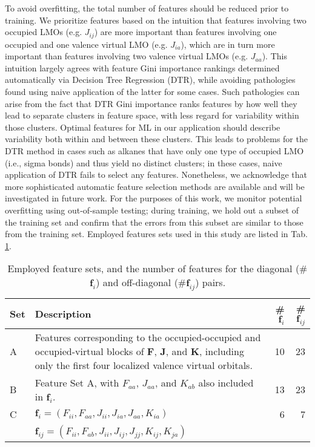 \documentclass[%
 aps,
 prb,
 twocolumn,
%
 reprint,%
%
citeautoscript,
%
showkeys
]{revtex4-1}
\begin{document}
%

%
%

To avoid overfitting, the total number of features should be reduced prior to training. We prioritize features based on the intuition that features involving two occupied LMOs (e.g. $J_{ij}$) are more important than features involving one occupied and one valence virtual LMO (e.g. $J_{ia}$), which are in turn more important than features involving two valence virtual LMOs (e.g. $J_{aa}$). %
%
This intuition largely agrees with feature Gini importance rankings determined automatically via Decision Tree Regression (DTR),\cite{DTR} while avoiding pathologies found using naive application of the latter for some cases. %
Such pathologies can arise from the fact that DTR Gini importance ranks features by how well they lead to separate clusters in feature space, with less regard for variability within those clusters.\cite{DTR} 
Optimal features for ML in our application should describe  variability both within and between these clusters. 
This leads to problems for the DTR method in cases such as alkanes that have only one type of occupied LMO (i.e., sigma bonds) and thus yield no distinct clusters; in these cases, naive application of DTR fails to select any features. Nonetheless, we acknowledge that more sophisticated automatic feature selection methods are available and will be investigated in future work.
For the purposes of this work, we monitor potential overfitting using out-of-sample testing; during training, we hold out a subset of the training set and confirm that the errors from this subset are similar to those from the training set.
%
%
Employed features sets used in this study are listed in Tab. \ref{table:feature_sets}.
%


\begin{table}[htbp]
\caption{Employed feature sets, %
and the number of features for the diagonal (\#$\mathbf{f}_i$) and off-diagonal (\#$\mathbf{f}_{ij}$) pairs.}
%
\begin{ruledtabular}
\begin{tabular}{lp{2.3in}rr}
Set&Description&\#$\mathbf{f}_i$&\#$\mathbf{f}_{ij}$\\ \hline
A & Features corresponding to the occupied-occupied and occupied-virtual blocks of \textbf{F}, \textbf{J}, and \textbf{K}, including only  the first four localized valence virtual orbitals. %
& 10 & 23\\ 

B & Feature Set A, with $F_{aa}$, $J_{aa}$, and $K_{ab}$ also included in $\mathbf{f}_{i}$. & 13 & 23\\

C & $\mathbf{f}_i = \left(F_{ii}, F_{aa}, J_{ii}, J_{ia}, J_{aa}, K_{ia}\right)$ & 6 & 7\\
  & $\mathbf{f}_{ij} = \left(F_{ii}, F_{ab}, J_{ii}, J_{ij}, J_{jj}, K_{ij}, K_{ja}\right)$\\
\end{tabular}
\end{ruledtabular}
\label{table:feature_sets}
\end{table}
\end{document}
